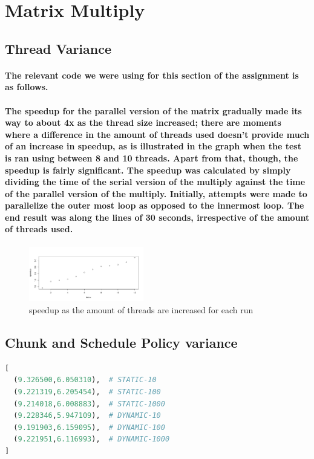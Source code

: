 \documentclass[8pt, a4paper, twoside, twoclumn, english]{extreport}
\begin{document}
\section{Matrix Multiply}

\subsection{Thread Variance}

\paragraph{The relevant code we were using for this section of the assignment is as follows.}

\paragraph{The speedup for the parallel version of the matrix gradually made its way to about 4x as the thread size increased; there are moments where a difference in the amount of threads used doesn't provide much of an increase in speedup, as is illustrated in the graph when the test is ran using between 8 and 10 threads. Apart from that, though, the speedup is fairly significant. The speedup was calculated by simply dividing the time of the serial version of the multiply against the time of the parallel version of the multiply.
Initially, attempts were made to parallelize the outer most loop as opposed to the innermost loop. The end result was along the lines of 30 seconds, irrespective of the amount of threads used.}

\begin{figure}[h]
\caption{speedup as the amount of threads are increased for each run}
\centering
\includegraphics[width=50mm,scale=0.5]{matrix_mul_speedup}
\end{figure}

\subsection{Chunk and Schedule Policy variance}

\begin{lstlisting}[language=Python]
[
  (9.326500,6.050310),  # STATIC-10
  (9.221319,6.205454),  # STATIC-100
  (9.214018,6.008883),  # STATIC-1000
  (9.228346,5.947109),  # DYNAMIC-10
  (9.191903,6.159095),  # DYNAMIC-100
  (9.221951,6.116993),  # DYNAMIC-1000
]
\end{lstlisting}
\end{document}
